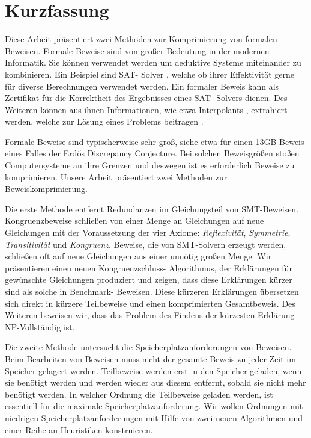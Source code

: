 \chapter*{Kurzfassung}

Diese Arbeit präsentiert zwei Methoden zur Komprimierung von formalen Beweisen.
Formale Beweise sind von gro{\ss}er Bedeutung in der modernen Informatik.
Sie k\"onnen verwendet werden um deduktive Systeme miteinander zu kombinieren. 
Ein Beispiel sind SAT- Solver \cite{Biere2009}, welche ob ihrer Effektivit\"at gerne f\"ur diverse Berechnungen verwendet werden.
Ein formaler Beweis kann als Zertifikat f\"ur die Korrektheit des Ergebnisses eines SAT- Solvers dienen.
Des Weiteren k\"onnen aus ihnen Informationen, wie etwa Interpolants \cite{McMill2005}, extrahiert werden, welche zur L\"osung eines Problems beitragen \cite{Hofferek2013}.

Formale Beweise sind typischerweise sehr gro{\ss}, siehe etwa \cite{Konev2014} f\"ur einen 13GB Beweis eines Falles der Erd\H{o}s Discrepancy Conjecture.
Bei solchen Beweisgr\"o{\ss}en sto{\ss}en Computersysteme an ihre Grenzen und deswegen ist es erforderlich Beweise zu komprimieren.
Unsere Arbeit pr\"asentiert zwei Methoden zur Beweiskomprimierung.

Die erste Methode entfernt Redundanzen im Gleichungsteil von SMT-Beweisen.
Kongruenzbeweise schlie{\ss}en von einer Menge an Gleichungen auf neue Gleichungen mit der Voraussetzung der vier Axiome: \emph{Reflexivit\"at}, \emph{Symmetrie}, \emph{Transitivit\"at} und \emph{Kongruenz}.
Beweise, die von SMT-Solvern erzeugt werden, schlie{\ss}en oft auf neue Gleichungen aus einer unn\"otig gro{\ss}en Menge.
Wir pr\"asentieren einen neuen Kongruenzschluss- Algorithmus, der Erkl\"arungen f\"ur gew\"unschte Gleichungen produziert und zeigen, dass diese Erkl\"arungen k\"urzer sind als solche in Benchmark- Beweisen.
Diese k\"urzeren Erkl\"arungen \"ubersetzen sich direkt in k\"urzere Teilbeweise und einen komprimierten Gesamtbeweis.
Des Weiteren beweisen wir, dass das Problem des Findens der k\"urzesten Erkl\"arung NP-Vollst\"andig ist.

Die zweite Methode untersucht die Speicherplatzanforderungen von Beweisen.
Beim Bearbeiten von Beweisen muss nicht der gesamte Beweis zu jeder Zeit im Speicher gelagert werden.
Teilbeweise werden erst in den Speicher geladen, wenn sie ben\"otigt werden und werden wieder aus diesem entfernt, sobald sie nicht mehr ben\"otigt werden.
In welcher Ordnung die Teilbeweise geladen werden, ist essentiell f\"ur die maximale Speicherplatzanforderung.
Wir wollen Ordnungen mit niedrigen Speicherplatzanforderungen mit Hilfe von zwei neuen Algorithmen und einer Reihe an Heuristiken konstruieren.